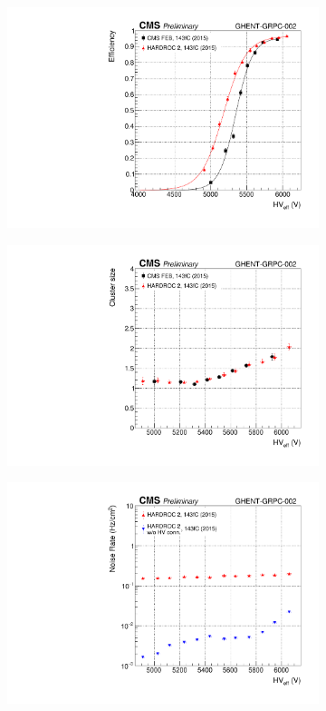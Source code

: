 	\begin{figure}[H]
		\begin{subfigure}{.5\linewidth}
		    \centering
			\includegraphics[width=\linewidth]{fig/chapt6/gRPC-HARDROC2-Eff-Shift.pdf}
			\caption{\label{fig:HARDROC2-gRPC:A}}
		\end{subfigure}
		\begin{subfigure}{.5\linewidth}
		    \centering
			\includegraphics[width = \linewidth]{fig/chapt6/gRPC-HARDROC2-ClS-Shift.pdf}
			\caption{\label{fig:HARDROC2-gRPC:B}}
		\end{subfigure}
		\begin{subfigure}{\linewidth}
		    \centering
			\includegraphics[width = .5\linewidth]{fig/chapt6/gRPC-HARDROC2-Rate-Shift.pdf}

\end{subfigure}
\end{figure}
